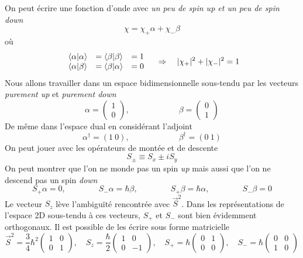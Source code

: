 On peut écrire une fonction d'onde avec \textit{un peu de spin up et un peu de spin down}
\begin{equation}
\chi = \chi_+\alpha+\chi_-\beta
\end{equation}
où
\begin{equation}
\begin{array}{lll}
\bra{\alpha}\ket{\alpha} &= \bra{\beta}\ket{\beta} &= 1\\
\bra{\alpha}\ket{\beta} &= \bra{\beta}\ket{\alpha} &= 0
\end{array}\quad\Rightarrow\quad |\chi_+|^2+|\chi_-|^2=1
\end{equation}
Nous allons travailler dans un espace bidimensionnelle sous-tendu par les vecteurs \textit{purement up} et 
\textit{purement down}
\begin{equation}
\alpha = \left(\begin{array}{c}
1\\
0
\end{array}\right),\qquad\qquad\qquad\beta = \left(\begin{array}{c}
0\\
1
\end{array}\right)
\end{equation}
De même dans l'espace dual en considérant l'adjoint
\begin{equation}
\alpha^\dagger = (1\ 0), \qquad\qquad\qquad \beta^\dagger = (0\ 1)
\end{equation}
On peut jouer avec les opérateurs de montée et de descente
\begin{equation}
S_\pm \equiv S_x \pm i S_y
\end{equation}
On peut montrer que l'on ne monde pas un spin \textit{up} mais aussi que l'on ne descend pas un spin \textit{down}
\begin{equation}
S_+\alpha = 0,\qquad\qquad S_-\alpha = \hbar\beta,\qquad\qquad S_+\beta = \hbar\alpha,\qquad\qquad S_-\beta = 0
\end{equation}
Le vecteur $S_z$ lève l'ambiguïté rencontrée avec $\vec S^2$. Dans les représentations de l'espace 2D sous-tendu
à ces vecteurs, $S_+$ et $S_-$ sont bien évidemment orthogonaux. Il est possible de les écrire sous forme
matricielle
\begin{equation}
\vec{S}^2 = \frac{3}{4}\hbar^2\left(\begin{array}{cc}
1&0\\
0&1
\end{array}\right),\quad 
S_z = \frac{\hbar}{2}\left(\begin{array}{cc}
1&0\\
0&-1
\end{array}\right),\quad
S_+ = \hbar\left(\begin{array}{cc}
0&1\\
0&0
\end{array}\right),\quad S_- = \hbar\left(\begin{array}{cc}
0&0\\
1&0
\end{array}\right)
\end{equation}
